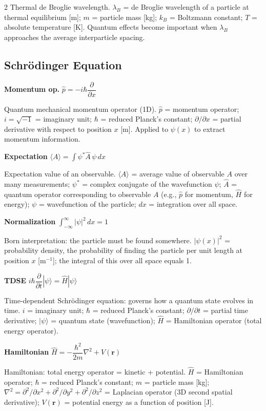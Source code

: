 \documentclass[9pt]{extarticle}
\newcommand{\eqlabel}[1]{\textbf{\scriptsize #1}\;}
\newcommand{\desc}[1]{{\small\color{desc}#1}}
\begin{document}
\begin{multicols}{2}
\desc{Thermal de Broglie wavelength. $\lambda_B$ = de Broglie wavelength of a particle at thermal equilibrium [m]; $m$ = particle mass [kg]; $k_B$ = Boltzmann constant; $T$ = absolute temperature [K]. Quantum effects become important when $\lambda_B$ approaches the average interparticle spacing.}

\subsection{Schr\"odinger Equation}
\eqlabel{Momentum op.}
$\hat{p} = -i\hbar\dfrac{\partial}{\partial x}$

\desc{Quantum mechanical momentum operator (1D). $\hat{p}$ = momentum operator; $i = \sqrt{-1}$ = imaginary unit; $\hbar$ = reduced Planck's constant; $\partial/\partial x$ = partial derivative with respect to position $x$ [m]. Applied to $\psi(x)$ to extract momentum information.}

\eqlabel{Expectation}
$\langle A \rangle = \displaystyle\int \psi^* \hat{A}\,\psi\,dx$

\desc{Expectation value of an observable. $\langle A \rangle$ = average value of observable $A$ over many measurements; $\psi^*$ = complex conjugate of the wavefunction $\psi$; $\hat{A}$ = quantum operator corresponding to observable $A$ (e.g., $\hat{p}$ for momentum, $\hat{H}$ for energy); $\psi$ = wavefunction of the particle; $dx$ = integration over all space.}

\eqlabel{Normalization}
$\displaystyle\int_{-\infty}^{\infty}|\psi|^2\,dx = 1$

\desc{Born interpretation: the particle must be found somewhere. $|\psi(x)|^2$ = probability density, the probability of finding the particle per unit length at position $x$ [m$^{-1}$]; the integral of this over all space equals 1.}

\eqlabel{TDSE}
$i\hbar\dfrac{\partial}{\partial t}|\psi\rangle = \hat{H}|\psi\rangle$

\desc{Time-dependent Schr\"odinger equation: governs how a quantum state evolves in time. $i$ = imaginary unit; $\hbar$ = reduced Planck's constant; $\partial/\partial t$ = partial time derivative; $|\psi\rangle$ = quantum state (wavefunction); $\hat{H}$ = Hamiltonian operator (total energy operator).}

\eqlabel{Hamiltonian}
$\hat{H} = -\dfrac{\hbar^2}{2m}\nabla^2 + V(\mathbf{r})$

\desc{Hamiltonian: total energy operator = kinetic + potential. $\hat{H}$ = Hamiltonian operator; $\hbar$ = reduced Planck's constant; $m$ = particle mass [kg]; $\nabla^2 = \partial^2/\partial x^2 + \partial^2/\partial y^2 + \partial^2/\partial z^2$ = Laplacian operator (3D second spatial derivative); $V(\mathbf{r})$ = potential energy as a function of position [J].}


\end{multicols}
\end{document}

